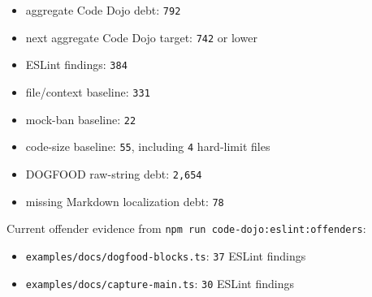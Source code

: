 \begin{itemize}
\tightlist
\item
  aggregate Code Dojo debt: \texttt{7\allowbreak{}9\allowbreak{}2}
\item
  next aggregate Code Dojo target: \texttt{7\allowbreak{}4\allowbreak{}2} or lower
\item
  ESLint findings: \texttt{3\allowbreak{}8\allowbreak{}4}
\item
  file/context baseline: \texttt{3\allowbreak{}3\allowbreak{}1}
\item
  mock-ban baseline: \texttt{2\allowbreak{}2}
\item
  code-size baseline: \texttt{5\allowbreak{}5}, including \texttt{4} hard-limit files
\item
  DOGFOOD raw-string debt: \texttt{2\allowbreak{},\allowbreak{}6\allowbreak{}5\allowbreak{}4}
\item
  missing Markdown localization debt: \texttt{7\allowbreak{}8}
\end{itemize}

Current offender evidence from \texttt{n\allowbreak{}p\allowbreak{}m\allowbreak{} \allowbreak{}r\allowbreak{}u\allowbreak{}n\allowbreak{} \allowbreak{}c\allowbreak{}o\allowbreak{}d\allowbreak{}e\allowbreak{}-\allowbreak{}d\allowbreak{}o\allowbreak{}j\allowbreak{}o\allowbreak{}:\allowbreak{}e\allowbreak{}s\allowbreak{}l\allowbreak{}i\allowbreak{}n\allowbreak{}t\allowbreak{}:\allowbreak{}o\allowbreak{}f\allowbreak{}f\allowbreak{}e\allowbreak{}n\allowbreak{}d\allowbreak{}e\allowbreak{}r\allowbreak{}s}:

\begin{itemize}
\tightlist
\item
  \texttt{e\allowbreak{}x\allowbreak{}a\allowbreak{}m\allowbreak{}p\allowbreak{}l\allowbreak{}e\allowbreak{}s\allowbreak{}/\allowbreak{}d\allowbreak{}o\allowbreak{}c\allowbreak{}s\allowbreak{}/\allowbreak{}d\allowbreak{}o\allowbreak{}g\allowbreak{}f\allowbreak{}o\allowbreak{}o\allowbreak{}d\allowbreak{}-\allowbreak{}b\allowbreak{}l\allowbreak{}o\allowbreak{}c\allowbreak{}k\allowbreak{}s\allowbreak{}.\allowbreak{}t\allowbreak{}s}: \texttt{3\allowbreak{}7} ESLint findings
\item
  \texttt{e\allowbreak{}x\allowbreak{}a\allowbreak{}m\allowbreak{}p\allowbreak{}l\allowbreak{}e\allowbreak{}s\allowbreak{}/\allowbreak{}d\allowbreak{}o\allowbreak{}c\allowbreak{}s\allowbreak{}/\allowbreak{}c\allowbreak{}a\allowbreak{}p\allowbreak{}t\allowbreak{}u\allowbreak{}r\allowbreak{}e\allowbreak{}-\allowbreak{}m\allowbreak{}a\allowbreak{}i\allowbreak{}n\allowbreak{}.\allowbreak{}t\allowbreak{}s}: \texttt{3\allowbreak{}0} ESLint findings
\end{itemize}

